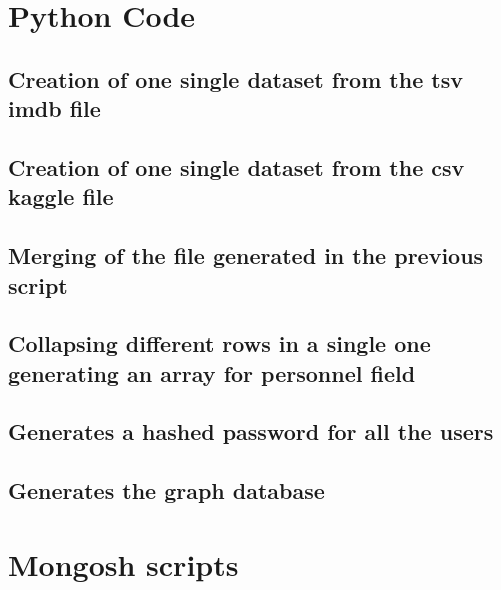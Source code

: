 %
%
\justifying

\begin{alphasection}
\section{Python Code}\label{sec:pycode}
\subsection{Creation of one single dataset from the tsv imdb file}\label{subsec:datasetGeneratorImdb}


\subsection{Creation of one single dataset from the csv kaggle file}\label{subsec:datasetGeneratorRotten}


\subsection{Merging of the file generated in the previous script}\label{subsec:datasetMerge}


\subsection{Collapsing different rows in a single one generating an array for personnel field}\label{subsec:datasetPersonnelCollapse}


\subsection{Generates a hashed password for all the users}\label{subsec:createUserPassword}


\subsection{Generates the graph database}\label{subsec:createGraphDB}

\newpage
\section{Mongosh scripts}

\end{alphasection}
